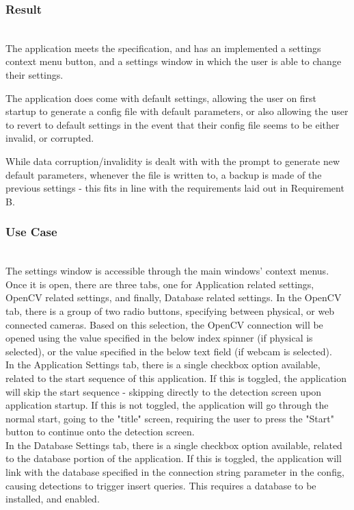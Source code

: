 \documentclass[conference]{IEEEtran}
\begin{document}
\subsubsection{Result}~\\
The application meets the specification, and has an implemented a settings context menu button, and a settings window in which the user is able to change their settings.

The application does come with default settings, allowing the user on first startup to generate a config file with default parameters, or also allowing the user to revert to default settings in the event that their config file seems to be either invalid, or corrupted.

While data corruption/invalidity is dealt with with the prompt to generate new default parameters, whenever the file is written to, a backup is made of the previous settings - this fits in line with the requirements laid out in Requirement B.~\\

\subsubsection{Use Case}~\\
The settings window is accessible through the main windows' context menus. Once it is open, there are three tabs, one for Application related settings, OpenCV related settings, and finally, Database related settings. In the OpenCV tab, there is a group of two radio buttons, specifying between physical, or web connected cameras. Based on this selection, the OpenCV connection will be opened using the value specified in the below index spinner (if physical is selected), or the value specified in the below text field (if webcam is selected).\\

In the Application Settings tab, there is a single checkbox option available, related to the start sequence of this application. If this is toggled, the application will skip the start sequence - skipping directly to the detection screen upon application startup. If this is not toggled, the application will go through the normal start, going to the "title" screen, requiring the user to press the "Start" button to continue onto the detection screen.\\

In the Database Settings tab, there is a single checkbox option available, related to the database portion of the application. If this is toggled, the application will link with the database specified in the connection string parameter in the config, causing detections to trigger insert queries. This requires a database to be installed, and enabled.\\
\end{document}
